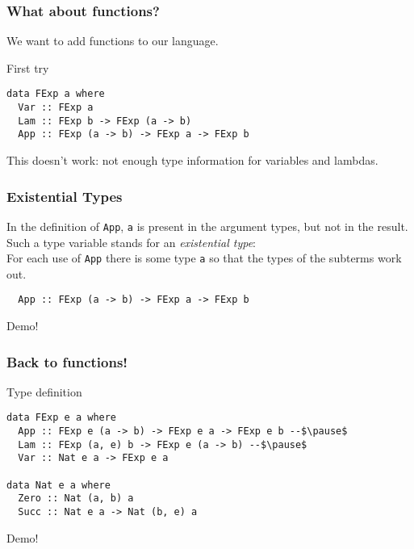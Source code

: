 \documentclass[pdftex,aspectratio=169]{beamer}
\begin{document}
\begin{frame}[fragile]
  \frametitle{What about functions?}

  We want to add functions to our language.\pause

  \begin{block}{First try}
    \begin{lstlisting}
data FExp a where
  Var :: FExp a
  Lam :: FExp b -> FExp (a -> b)
  App :: FExp (a -> b) -> FExp a -> FExp b      
    \end{lstlisting}
  \end{block}\pause

  This doesn't work: not enough type information for variables and lambdas.
\end{frame}

\begin{frame}[fragile]
  \frametitle{Existential Types}

  In the definition of \lstinline{App}, \lstinline{a} is present in
  the argument types, but not in the result. Such a type variable
  stands for an \emph{existential type}: \\
  For each use of \lstinline{App} there is some type \lstinline{a} so
  that the types of the subterms work out.
  \begin{block}{}
    \begin{lstlisting}
  App :: FExp (a -> b) -> FExp a -> FExp b      
    \end{lstlisting}
  \end{block}\pause
  Demo!
\end{frame}

\begin{frame}[fragile]
  \frametitle{Back to functions!}
  \begin{block}{Type definition}
  \begin{lstlisting}
data FExp e a where
  App :: FExp e (a -> b) -> FExp e a -> FExp e b --$\pause$
  Lam :: FExp (a, e) b -> FExp e (a -> b) --$\pause$
  Var :: Nat e a -> FExp e a

data Nat e a where
  Zero :: Nat (a, b) a
  Succ :: Nat e a -> Nat (b, e) a
\end{lstlisting}
\end{block}\pause
Demo!
\end{frame}
\end{document}
